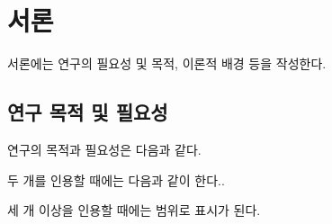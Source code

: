 \section{서론}
서론에는 연구의 필요성 및 목적, 이론적 배경 등을 작성한다.

\subsection{연구 목적 및 필요성}
연구의 목적과 필요성은 다음과 같다\cite{Taylor1989}.

두 개를 인용할 때에는 다음과 같이 한다.\cite{aksin,gillies}.

세 개 이상을 인용할 때에는 범위로 표시가 된다\cite{Taylor1989,aksin,gillies}.
